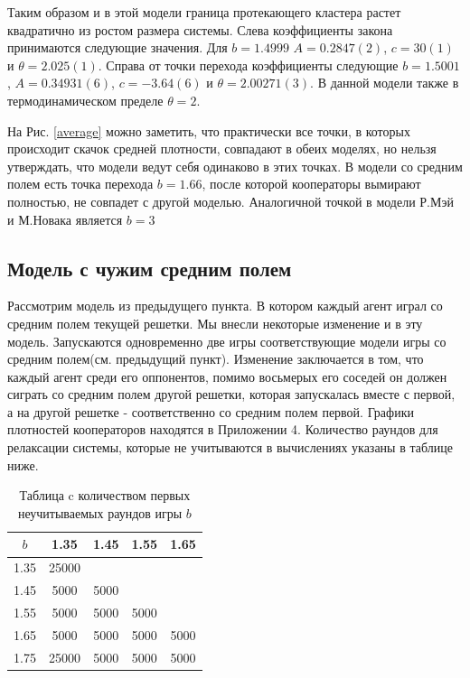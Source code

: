 \documentclass[a4paper]{article}
\begin{document}
	\par Таким образом и в этой модели граница протекающего кластера растет квадратично из ростом размера системы. Слева коэффициенты закона принимаются следующие значения. Для $b=1.4999$ $A=0.2847(2)$,
	$c=30(1)$ и $\theta=2.025(1)$. Справа от точки перехода коэффициенты следующие
	$b=1.5001$, $A=0.34931(6)$, $c=-3.64(6) $ и $\theta=2.00271(3) $. В данной модели также в термодинамическом пределе $\theta = 2$\cite{me}.
	
	\par На Рис. \ref{average} можно заметить, что практически все точки, в которых происходит скачок средней плотности, совпадают в обеих моделях, но нельзя утверждать, что модели ведут себя одинаково в этих точках. В модели со средним полем есть точка перехода $b=1.66$, после которой кооператоры вымирают полностью, не совпадет с другой моделью. Аналогичной точкой в модели Р.Мэй и М.Новака является $b=3$
	

	\subsection{Модель с чужим средним полем}
	
	\par Рассмотрим модель из предыдущего пункта. В котором каждый агент играл со средним полем текущей решетки. Мы внесли некоторые изменение и в эту модель. Запускаются одновременно две игры соответствующие модели игры со средним полем(см. предыдущий пункт). Изменение заключается в том, что каждый агент среди его оппонентов, помимо восьмерых его соседей он должен сиграть со средним полем другой решетки, которая запускалась вместе с первой, а на другой решетке - соответственно со средним полем первой. Графики плотностей кооператоров находятся в Приложении 4. Количество раундов для релаксации системы, которые не учитываются в вычислениях указаны в таблице ниже.
	
	\begin{table}[H]
		\centering
		\begin{tabular}{|c|c|c|c|c|}
			\hline 
			$b$ & 1.35 & 1.45 & 1.55 & 1.65 \\ 
			\hline 
			1.35 & 25000 &  &  & \\ 
			\hline 
			1.45 & 5000 & 5000 &  &  \\
			\hline 
			1.55 & 5000 & 5000 & 5000 &  \\
			\hline 
			1.65 & 5000 & 5000 & 5000 & 5000   \\
			\hline 
			1.75 & 25000 & 5000 & 5000 & 5000  \\
			\hline 
		\end{tabular}
		\caption{Таблица c количеством первых неучитываемых раундов игры $b$}
		\label{dep_slice} 
	\end{table}
	
\end{document}
